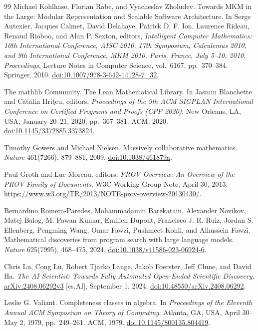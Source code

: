 \begin{thebibliography}{99}
Michael Kohlhase, Florian Rabe, and Vyacheslav Zholudev.
Towards MKM in the Large: Modular Representation and Scalable Software Architecture.
In Serge Autexier, Jacques Calmet, David Delahaye, Patrick D. F. Ion, Laurence Rideau, Renaud Rioboo, and Alan P. Sexton, editors, \emph{Intelligent Computer Mathematics: 10th International Conference, AISC 2010, 17th Symposium, Calculemus 2010, and 9th International Conference, MKM 2010, Paris, France, July 5--10, 2010. Proceedings}, Lecture Notes in Computer Science, vol.\ 6167, pp.\ 370--384. Springer, 2010.
\href{https://doi.org/10.1007/978-3-642-14128-7_32}{doi:10.1007/978-3-642-14128-7\_32}.

The mathlib Community.
The Lean Mathematical Library.
In Jasmin Blanchette and C\u{a}t\u{a}lin Hri\c{t}cu, editors, \emph{Proceedings of the 9th ACM SIGPLAN International Conference on Certified Programs and Proofs (CPP 2020)}, New Orleans, LA, USA, January 20--21, 2020, pp.\ 367--381. ACM, 2020.
\href{https://doi.org/10.1145/3372885.3373824}{doi:10.1145/3372885.3373824}.

Timothy Gowers and Michael Nielsen.
Massively collaborative mathematics.
\emph{Nature} 461(7266), 879--881, 2009.
\href{https://doi.org/10.1038/461879a}{doi:10.1038/461879a}.

Paul Groth and Luc Moreau, editors.
\emph{PROV-Overview: An Overview of the PROV Family of Documents}.
W3C Working Group Note, April 30, 2013.
\url{https://www.w3.org/TR/2013/NOTE-prov-overview-20130430/}.

Bernardino Romera-Paredes, Mohammadamin Barekatain, Alexander Novikov, Matej Balog, M. Pawan Kumar, Emilien Dupont, Francisco J. R. Ruiz, Jordan S. Ellenberg, Pengming Wang, Omar Fawzi, Pushmeet Kohli, and Alhussein Fawzi.
Mathematical discoveries from program search with large language models.
\emph{Nature} 625(7995), 468--475, 2024.
\href{https://doi.org/10.1038/s41586-023-06924-6}{doi:10.1038/s41586-023-06924-6}.

Chris Lu, Cong Lu, Robert Tjarko Lange, Jakob Foerster, Jeff Clune, and David Ha.
\emph{The AI Scientist: Towards Fully Automated Open-Ended Scientific Discovery}.
\href{https://arxiv.org/abs/2408.06292v3}{arXiv:2408.06292v3} [cs.AI], September 1, 2024.
\href{https://doi.org/10.48550/arXiv.2408.06292}{doi:10.48550/arXiv.2408.06292}.

Leslie G. Valiant.
Completeness classes in algebra.
In \emph{Proceedings of the Eleventh Annual ACM Symposium on Theory of Computing}, Atlanta, GA, USA, April 30--May 2, 1979, pp.\ 249--261. ACM, 1979.
\href{https://doi.org/10.1145/800135.804419}{doi:10.1145/800135.804419}.


\end{thebibliography}
